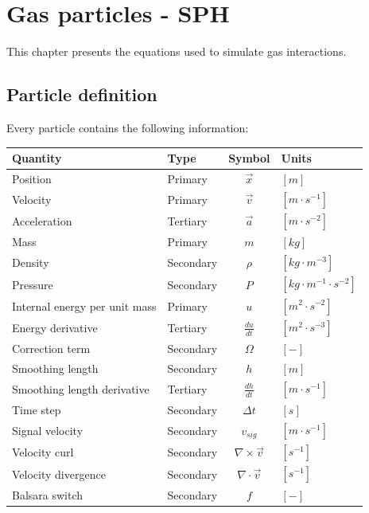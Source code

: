 \documentclass[a4paper,10pt]{report}
\begin{document}
% 
% 







\chapter{Gas particles - SPH}
\label{chap:SPH}

This chapter presents the equations used to simulate gas interactions.

\section{Particle definition}
Every particle contains the following information:

\begin{table}[h]
\centering
\begin{tabular}{|l|l|c|l|}
 \hline
 \textbf{Quantity} & \textbf{Type} & \textbf{Symbol} & \textbf{Units} \\
 \hline \hline
 Position & Primary & $\vec{x}$ & $[m]$ \\
 Velocity & Primary &$\vec{v}$ & $[m\cdot s^{-1}]$ \\
 Acceleration & Tertiary &$\vec{a}$ & $[m\cdot s^{-2}]$ \\
 Mass & Primary &$m$ & $[kg]$ \\
 Density & Secondary & $\rho$ & $[kg\cdot m^{-3}]$ \\
 Pressure & Secondary & $P$ & $[kg \cdot m^{-1}\cdot s^{-2}]$ \\
 Internal energy per unit mass & Primary & $u$ & $[m^2 \cdot s^{-2}]$ \\ 
 Energy derivative & Tertiary & $\frac{du}{dt}$ & $[ m^2 \cdot s^{-3}]$ \\
 Correction term & Secondary & $\Omega$ & $[-]$ \\
 Smoothing length & Secondary &$h$ & $[m]$ \\
 Smoothing length derivative & Tertiary &$\frac{dh}{dt}$ & $[m\cdot s^{-1}]$ \\
 Time step & Secondary & $\Delta t$ & $[s]$ \\
 Signal velocity & Secondary & $v_{sig}$& $[m\cdot s^{-1}]$ \\
\hline
 Velocity curl & Secondary & $\nabla\times \vec{v}$ & $[s^{-1}]$ \\
 Velocity divergence & Secondary & $\nabla\cdot \vec{v}$ & $[s^{-1}]$ \\
 Balsara switch & Secondary & $f$ & $[-]$ \\
\hline
\end{tabular} 
\end{table}
\end{document}
